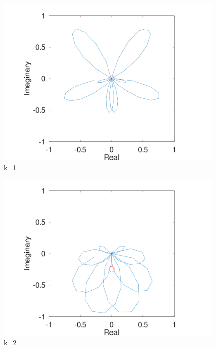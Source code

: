 \documentclass{article}
\begin{document}
\begin{figure}
\includegraphics[width=1\linewidth]{fourier3.png}
\caption{k=1}
\end{figure}

\begin{figure}
\includegraphics[width=1\linewidth]{fourier4.png}
\caption{k=2}
\end{figure}
\end{document}
